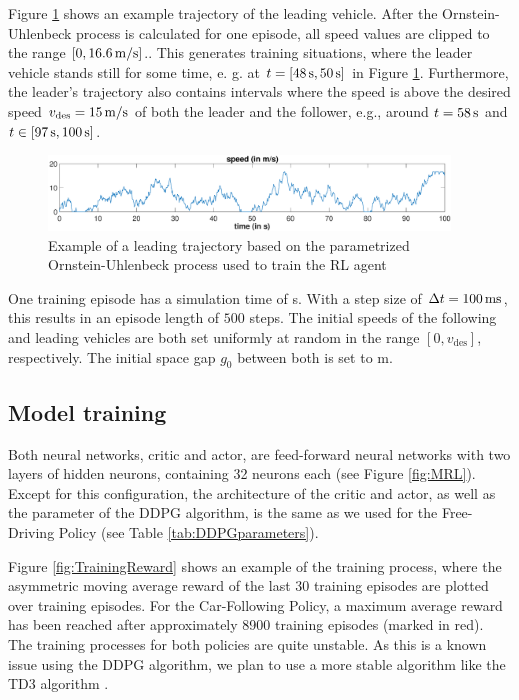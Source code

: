 \documentclass[review]{elsarticle}
\providecommand{\sub}[1]{_{\mathrm{#1}}}  %
\providecommand{\3}{{\ss}}
\begin{document}
	
	Figure \ref{fig:AR1process} shows an example trajectory of the leading
	vehicle. After the Ornstein-Uhlenbeck process is calculated for one
	episode, all speed values are clipped to the range $[0,\unit[16.6]{m/s}]$.. This generates
	training situations, where the leader vehicle stands still for some
	time, e. g. at $t= [\unit[48]{s}, \unit[50]{s}]$ in Figure
	\ref{fig:AR1process}. Furthermore, the leader's trajectory
	also contains intervals where the speed is above the desired speed
	$v\sub{des}=\unit[15]{m/s}$ of both the leader and the follower,
	e.g., around $t=\unit[58]{s}$ and $t\in [\unit[97]{s},
	\unit[100]{s}]$.
	\begin{figure}
		\centering
		\includegraphics[width=0.95\textwidth]{images/AR1process}
		\caption{Example of a leading trajectory based on the parametrized Ornstein-Uhlenbeck process used to train the RL agent}
		\label{fig:AR1process}
	\end{figure}
	One training episode has a simulation time of \unit[50]{s}.  With a step size of
	$\Delta t=\unit[100]{ms}$, this results in an episode length of $500$
	steps. The initial speeds of the following and leading vehicles are both
	set uniformly at random in the range $[0,v\sub{des}]$,
	respectively. The initial space gap $g_0$ between both is set to \unit[120]{m}. 
	
	\subsection{Model training}
	Both neural networks, critic and actor, are feed-forward neural networks with two layers of hidden neurons, containing 32 neurons each (see Figure \ref{fig:MRL}). Except for this configuration, the architecture of the critic and actor, as well as the parameter of the DDPG algorithm, is the same as we used for the Free-Driving Policy (see Table \ref{tab:DDPGparameters}).
	
	Figure \ref{fig:TrainingReward} shows an example of the training
	process, where the asymmetric moving average reward of the last 30
	training episodes are plotted over training episodes. For the
	Car-Following Policy, a maximum average reward has been reached after
	approximately 8900 training episodes (marked in red). The training processes for both policies are quite unstable. As this is a known issue using the DDPG algorithm, we plan to use a more stable algorithm like the TD3 algorithm \citep{TD3}.    
	
\end{document}

